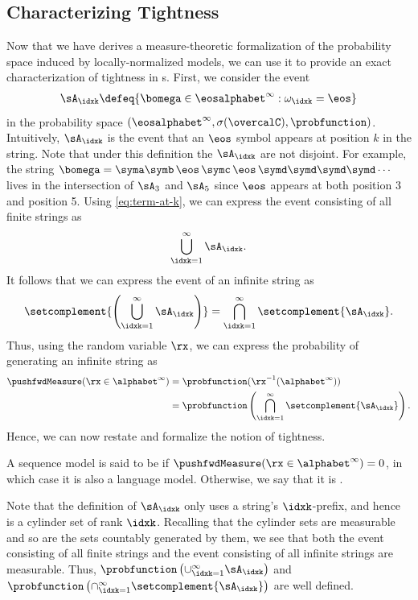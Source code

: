 \subsection{Characterizing Tightness} \label{sec:tightness}
Now that we have derives a measure-theoretic formalization of the probability space induced by locally-normalized models, we can use it to provide an exact characterization of tightness in \autoregmodel{}s. 
First, we consider the event
\begin{align}
\sA_\idxk\defeq\{\bomega\in\eosalphabet^\infty:\omega_\idxk=\eos\} \label{eq:term-at-k}
\end{align}
in the probability space $(\eosalphabet^\infty,\sigma(\overcalC),\probfunction)$. 
Intuitively, $\sA_\idxk$ is the event that an $\eos$ symbol appears at position $k$ in the string.
Note that under this definition the $\sA_\idxk$ are not disjoint.
For example, the string $\bomega = \syma\symb\,\eos\,\symc\,\eos\, \symd\symd\symd\symd\dotsm$ lives in the intersection of $\sA_3$ and $\sA_5$ since $\eos$ appears at both position 3 and position 5. 
Using \cref{eq:term-at-k}, we can express the event consisting of all finite strings as 
\begin{equation}
\bigcup_{\idxk=1}^\infty \sA_\idxk.
\end{equation}
It follows that we can express the event of an infinite string as 
\begin{equation}
    \setcomplement{\left(\bigcup_{\idxk=1}^\infty \sA_\idxk\right)}=\bigcap_{\idxk=1}^\infty \setcomplement{\sA_\idxk}.
\end{equation} 
Thus, using the random variable $\rx$, we can express the probability of generating an infinite string as
\begin{subequations}
    \begin{align}
    \pushfwdMeasure(\rx\in \alphabet^\infty)&=\probfunction(\rx^{-1} (\alphabet^\infty))  \\
 &=\probfunction\left(\bigcap_{\idxk=1}^\infty \setcomplement{\sA_\idxk}\right).
\end{align}
\end{subequations}
Hence, we can now restate and formalize the notion of tightness.
\begin{definition}
A sequence model is said to be  if $\pushfwdMeasure(\rx\in\alphabet^\infty) = 0$, in which case it is also a language model.
Otherwise, we say that it is .
\end{definition}

Note that the definition of $\sA_\idxk$ only uses a string's $\idxk$-prefix, and hence is a cylinder set of rank $\idxk$. 
Recalling that the cylinder sets are measurable and so are the sets countably generated by them, we see that both the event consisting of all finite strings and the event consisting of all infinite strings are measurable.
Thus, $\probfunction\left(\cup_{\idxk=1}^\infty \sA_\idxk\right)$ and $\probfunction\left(\cap_{\idxk=1}^{\infty} \setcomplement{\sA_\idxk}\right)$ are well defined.

